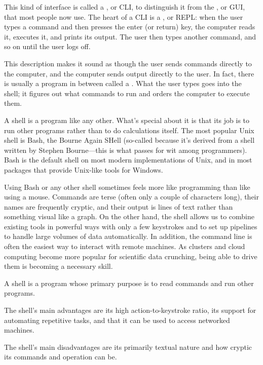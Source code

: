 \documentclass{book}
\begin{document}
This kind of interface is called a , or CLI, to distinguish it from the
, or GUI, that most people now
use. The heart of a CLI is a , or REPL: when the user types a command and then presses the enter
(or return) key, the computer reads it, executes it, and prints its
output. The user then types another command, and so on until the user
logs off.

This description makes it sound as though the user sends commands
directly to the computer, and the computer sends output directly to the
user. In fact, there is usually a program in between called a
. What the user types goes into the
shell; it figures out what commands to run and orders the computer to
execute them.

A shell is a program like any other. What's special about it is that its
job is to run other programs rather than to do calculations itself. The
most popular Unix shell is Bash, the Bourne Again SHell (so-called
because it's derived from a shell written by Stephen Bourne---this is
what passes for wit among programmers). Bash is the default shell on
most modern implementations of Unix, and in most packages that provide
Unix-like tools for Windows.

Using Bash or any other shell sometimes feels more like programming than
like using a mouse. Commands are terse (often only a couple of
characters long), their names are frequently cryptic, and their output
is lines of text rather than something visual like a graph. On the other
hand, the shell allows us to combine existing tools in powerful ways
with only a few keystrokes and to set up pipelines to handle large
volumes of data automatically. In addition, the command line is often
the easiest way to interact with remote machines. As clusters and cloud
computing become more popular for scientific data crunching, being able
to drive them is becoming a necessary skill.

\begin{keypoints}
\begin{swcitemize}
\item
  A shell is a program whose primary purpose is to read commands and run
  other programs.
\item
  The shell's main advantages are its high action-to-keystroke ratio,
  its support for automating repetitive tasks, and that it can be used
  to access networked machines.
\item
  The shell's main disadvantages are its primarily textual nature and
  how cryptic its commands and operation can be.
\end{swcitemize}
\end{keypoints}
\end{document}
